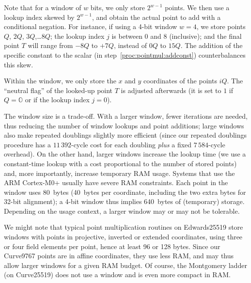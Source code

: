 \documentclass{llncs}
\newcommand{\neutral}{\mathbb{O}}
\begin{document}
Note that for a window of $w$ bits, we only store $2^{w-1}$ points. We
then use a lookup index skewed by $2^{w-1}$, and obtain the actual point
to add with a conditional negation. For instance, if using a 4-bit
window $w = 4$, we store points $Q$, $2Q$, $3Q$,\ldots $8Q$; the lookup
index $j$ is between $0$ and $8$ (inclusive); and the final point $T$
will range from $-8Q$ to $+7Q$, instead of $0Q$ to $15Q$. The addition
of the specific constant to the scalar (in
step~\ref{proc:pointmul:addconst}) counterbalances this skew.

Within the window, we only store the $x$ and $y$ coordinates of the
points $iQ$. The ``neutral flag'' of the looked-up point $T$ is
adjusted afterwards (it is set to $1$ if $Q = \neutral$ or if the
lookup index $j = 0$).

The window size is a trade-off. With a larger window, fewer iterations
are needed, thus reducing the number of window lookups and point
additions; large windows also make repeated doublings slightly more
efficient (since our repeated doublings procedure has a $11\,392$-cycle
cost for each doubling \emph{plus} a fixed $7\,584$-cycle overhead). On
the other hand, larger windows increase the lookup time (we use a
constant-time lookup with a cost proportional to the number of stored
points) and, more importantly, increase temporary RAM usage. Systems
that use the ARM Cortex-M0+ usually have severe RAM constraints. Each
point in the window uses 80~bytes (40~bytes per coordinate, including
the two extra bytes for 32-bit alignment); a 4-bit window thus implies
640~bytes of (temporary) storage. Depending on the usage context, a
larger window may or may not be tolerable.

We might note that typical point multiplication routines on Edwards25519
store windows with points in projective, inverted or extended
coordinates, using three or four field elements per point, hence at
least 96 or 128 bytes. Since our Curve9767 points are in affine
coordinates, they use less RAM, and may thus allow larger windows for a
given RAM budget. Of course, the Montgomery ladder (on Curve25519) does
not use a window and is even more compact in RAM.
\end{document}
